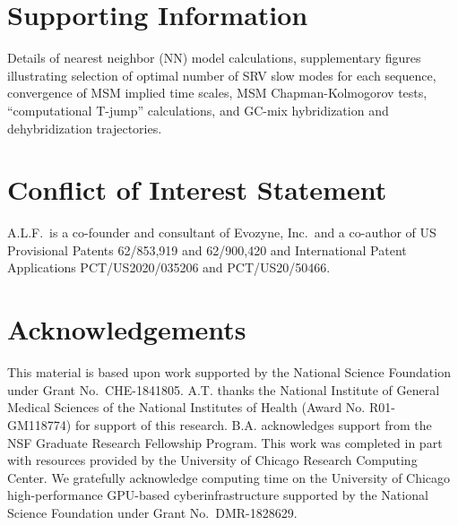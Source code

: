 \documentclass[journal=jpcbfk,manuscript=article]{achemso}
\begin{document}


\section*{Supporting Information}

Details of nearest neighbor (NN) model calculations, supplementary figures illustrating selection of optimal number of SRV slow modes for each sequence, convergence of MSM implied time scales, MSM Chapman-Kolmogorov tests, ``computational T-jump'' calculations, and GC-mix hybridization and dehybridization trajectories. 


\section*{Conflict of Interest Statement}

A.L.F.\ is a co-founder and consultant of Evozyne, Inc.\ and a co-author of US Provisional Patents 62/853,919 and 62/900,420 and International Patent Applications PCT/US2020/035206 and PCT/US20/50466.


\section*{Acknowledgements}

This material is based upon work supported by the National Science Foundation under Grant No.\ CHE-1841805. A.T. thanks the National Institute of General Medical Sciences of the National Institutes of Health (Award No. R01-GM118774) for support of this research. B.A. acknowledges support from the NSF Graduate Research Fellowship Program. This work was completed in part with resources provided by the University of Chicago Research Computing Center. We gratefully acknowledge computing time on the University of Chicago high-performance GPU-based cyberinfrastructure supported by the National Science Foundation under Grant No.\ DMR-1828629.
\end{document}
